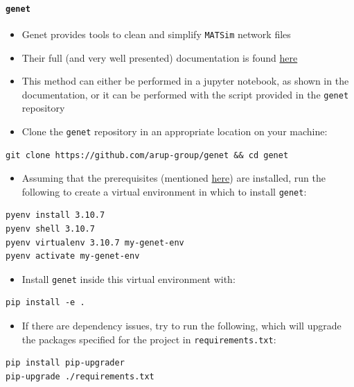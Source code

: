 \documentclass[11pt]{article}
\begin{document}
\paragraph{\texttt{genet}}
\label{sec:orge16fc80}
\begin{itemize}
\item Genet provides tools to clean and simplify \texttt{MATSim} network files
\item Their full (and very well presented) documentation is found \href{https://github.com/arup-group/genet/wiki/Usage:-5.3.-Modifying-Network:-Simplification}{here}
\item This method can either be performed in a jupyter notebook, as shown in the documentation, or it can be performed with the script provided in the \texttt{genet} repository
\end{itemize}

\begin{itemize}
\item Clone the \texttt{genet} repository in an appropriate location on your machine:
\end{itemize}
\begin{verbatim}
git clone https://github.com/arup-group/genet && cd genet
\end{verbatim}

\begin{itemize}
\item Assuming that the prerequisites (mentioned \hyperref[sec:org682f795]{here}) are installed, run the following to create a virtual environment in which to install \texttt{genet}:
\end{itemize}
\begin{verbatim}
pyenv install 3.10.7
pyenv shell 3.10.7
pyenv virtualenv 3.10.7 my-genet-env
pyenv activate my-genet-env
\end{verbatim}

\begin{itemize}
\item Install \texttt{genet} inside this virtual environment with:
\end{itemize}
\begin{verbatim}
pip install -e .
\end{verbatim}

\begin{itemize}
\item If there are dependency issues, try to run the following, which will upgrade the packages specified for the project in \texttt{requirements.txt}:
\end{itemize}
\begin{verbatim}
pip install pip-upgrader
pip-upgrade ./requirements.txt
\end{verbatim}
\end{document}
